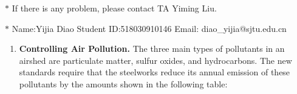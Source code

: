 \documentclass[12pt,a4paper]{article}
\theoremstyle{definition}
\begin{document}
\noindent

\noindent{}
\begin{center}
\footnotesize{\color{red}$*$ If there is any problem, please contact TA Yiming Liu. }

\footnotesize{\color{blue}$*$ Name:Yijia Diao  \quad Student ID:518030910146 \quad Email: diao\_yijia@sjtu.edu.cn}
\end{center}
\begin{enumerate}

   \item 
   \textbf{Controlling Air Pollution. }The three main types of pollutants in an airshed are particulate matter, sulfur oxides, and hydrocarbons. The new standards require that the steelworks reduce its annual emission of these pollutants by the amounts shown in the following table: 
	\begin{table}[h]
		\footnotesize
		\centering
	    \label{standards}
	    \renewcommand\arraystretch{1.1}
		\begin{tabular}{lc}
			

\end{tabular}
\end{table}
\end{enumerate}
\end{document}
